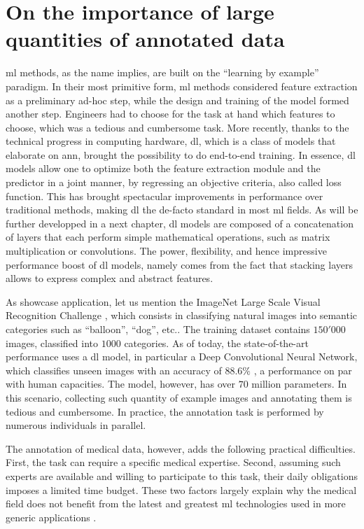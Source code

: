 \section{On the importance of large quantities of annotated data}
\Gls{ml} methods, as the name implies, are built on the ``learning by example'' paradigm.
In their most primitive form, \gls{ml} methods considered feature extraction as a preliminary ad-hoc step, while the design and training of the model formed another step.
Engineers had to choose for the task at hand which features to choose, which was a tedious and cumbersome task.
More recently, thanks to the technical progress in computing hardware, \gls{dl}, which is a class of models that elaborate on \gls{ann}, brought the possibility to do end-to-end training.
In essence, \gls{dl} models allow one to optimize both the feature extraction module and the predictor in a joint manner, by regressing an objective criteria, also called loss function.
This has brought spectacular improvements in performance over traditional methods, making \gls{dl} the de-facto standard in most \gls{ml} fields.
As will be further developped in a next chapter, \gls{dl} models are composed of a concatenation of layers that each perform simple mathematical operations, such as matrix multiplication or convolutions.
The power, flexibility, and hence impressive performance boost of \gls{dl} models, namely comes from the fact that stacking layers allows to express complex and abstract features.

As showcase application, let us mention the ImageNet Large Scale Visual Recognition Challenge \cite{ILSVRC15}, which consists in classifying natural images into semantic categories such as ``balloon'', ``dog'', etc..
The training dataset contains $150'000$ images, classified into $1000$ categories.
As of today, the state-of-the-art performance uses a \gls{dl} model, in particular a Deep Convolutional Neural Network, which classifies unseen images with an accuracy of $88.6\%$ \cite{tan19}, a performance on par with human capacities.
The model, however, has over $70$ million parameters.
In this scenario, collecting such quantity of example images and annotating them is tedious and cumbersome.
In practice, the annotation task is performed by numerous individuals in parallel.

The annotation of medical data, however, adds the following practical difficulties.
First, the task can require a specific medical expertise.
Second, assuming such experts are available and willing to participate to this task, their daily obligations imposes a limited time budget.
These two factors largely explain why the medical field does not benefit from the latest and greatest \gls{ml} technologies used in more generic applications \cite{orting19}.


